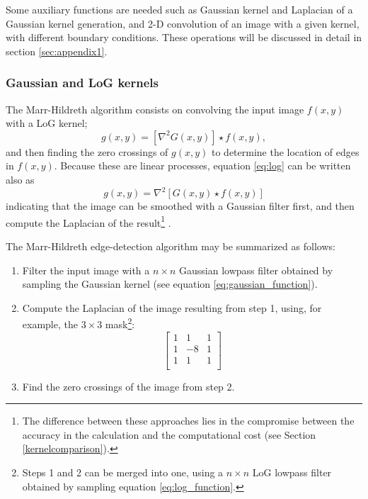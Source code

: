 \documentclass{ipol}
\numberwithin{equation}{section}
\numberwithin{table}{section}
\begin{document}
Some auxiliary functions are needed such as Gaussian kernel and Laplacian of a Gaussian 
kernel generation, and 2-D convolution of an image with a given kernel, 
with different boundary conditions. These operations will be discussed 
in detail in section \ref{sec:appendix1}.


\subsubsection{Gaussian and LoG kernels}

The Marr-Hildreth algorithm consists on convolving the input image $f(x,y)$ with a LoG kernel;
\begin{equation}\label{eq:log}
  g(x,y) = [\nabla^2G(x,y)]\star f(x,y), 
\end{equation}
and then finding the zero crossings of $g(x,y)$ to determine the location of edges in $f(x,y)$. 
Because these are linear processes, equation \ref{eq:log} can be written also as
\begin{equation}
  g(x,y) = \nabla^2[G(x,y)\star f(x,y)]
\end{equation}
indicating that the image can be smoothed with a Gaussian filter first, and then compute the Laplacian of the result\footnote{The difference between these approaches lies in the compromise between the accuracy in the calculation and the computational cost (see Section \ref{kernelcomparison}).} .


The Marr-Hildreth edge-detection algorithm may be summarized as follows:
\begin{enumerate}
	\item Filter the input image with a $n \times n$ Gaussian lowpass filter obtained by sampling the Gaussian kernel (see equation \ref{eq:gaussian_function}). %
	\item Compute the Laplacian of the image resulting from step 1, using, for example, the $3\times3$ mask\footnote{Steps 1 and 2 can be merged into one, using a $n\times n$ LoG lowpass filter obtained by sampling equation \ref{eq:log_function}.}:
	\begin{equation*}
		\begin{bmatrix}
			1 &  1 & 1 \\
			1 & -8 & 1 \\
			1 &  1 & 1 \\
		\end{bmatrix}
	\end{equation*}
	\item Find the zero crossings of the image from step 2.
\end{enumerate}
\end{document}
